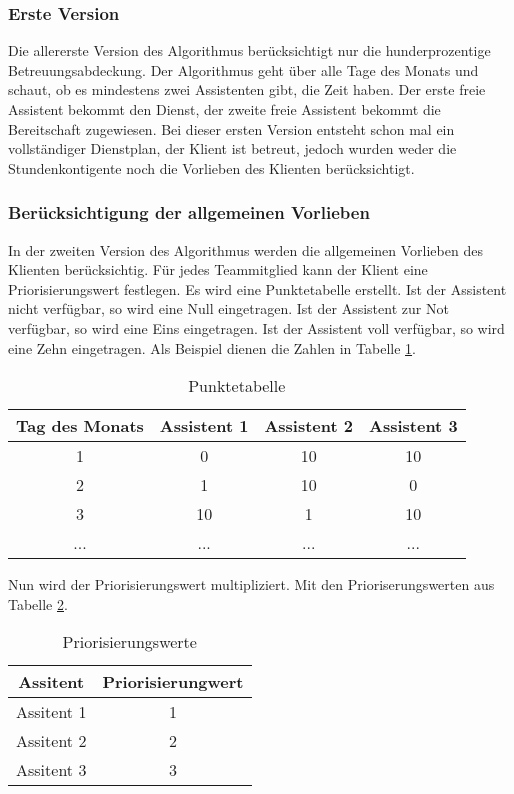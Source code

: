 \documentclass[12pt,a4paper,titlepage]{article} %
\begin{document}
\subsubsection{Erste Version}
Die allererste Version des Algorithmus berücksichtigt nur die hunderprozentige Betreuungsabdeckung. Der Algorithmus geht über alle Tage des Monats und schaut, ob es mindestens zwei Assistenten gibt, die Zeit haben. Der erste freie Assistent bekommt den Dienst, der zweite freie Assistent bekommt die Bereitschaft zugewiesen. Bei dieser ersten Version entsteht schon mal ein vollständiger Dienstplan, der Klient ist betreut, jedoch wurden weder die Stundenkontigente noch die Vorlieben des Klienten berücksichtigt.

\subsubsection{Berücksichtigung der allgemeinen Vorlieben}
In der zweiten Version des Algorithmus werden die allgemeinen Vorlieben des Klienten berücksichtig. Für jedes Teammitglied kann der Klient eine Priorisierungswert festlegen. %
Es wird eine Punktetabelle erstellt. Ist der Assistent nicht verfügbar, so wird eine Null eingetragen. Ist der Assistent zur Not verfügbar, so wird eine Eins eingetragen. Ist der Assistent voll verfügbar, so wird eine Zehn eingetragen. Als Beispiel dienen die Zahlen in Tabelle \ref{tab:scoreTable}.

\begin{table}[htb]
	\centering
\begin{tabular}{|c|c|c|c|}
\hline 
Tag des Monats & Assistent 1 & Assistent 2 & Assistent 3 \\ 
\hline 
1 & 0 & 10 & 10 \\ 
\hline 
2 & 1 & 10 & 0 \\ 
\hline 
3 & 10 & 1 & 10 \\ 
\hline 
... & ... & ... & ... \\ 
\hline 
\end{tabular} 
\caption{Punktetabelle}
	\label{tab:scoreTable}
\end{table}

Nun wird der Priorisierungswert multipliziert. Mit den Prioriserungswerten  aus Tabelle \ref{tab:teamMemberPriorities}.

\begin{table}[htb]
	\centering
\begin{tabular}{|c|c|}
\hline 
Assitent & Priorisierungwert \\ 
\hline 
Assitent 1 & 1 \\ 
\hline 
Assitent 2 & 2 \\ 
\hline 
Assitent 3 & 3 \\ 
\hline 
\end{tabular} 
\caption{Priorisierungswerte}
	\label{tab:teamMemberPriorities}
\end{table}
\end{document}
